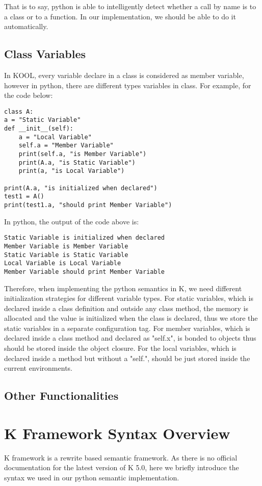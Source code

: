 \documentclass[a4paper]{article}
\begin{document}
That is to say, python is able to intelligently detect whether a call by name is to a class or to a function. In our implementation, we should be able to do it automatically.

\subsection{Class Variables}
In KOOL, every variable declare in a class is considered as member variable, however in python, there are different types variables in class. For example, for the code below:

\begin{lstlisting}
class A:
a = "Static Variable"
def __init__(self):
    a = "Local Variable"
    self.a = "Member Variable"
    print(self.a, "is Member Variable")
    print(A.a, "is Static Variable")
    print(a, "is Local Variable")

print(A.a, "is initialized when declared")
test1 = A()
print(test1.a, "should print Member Variable")
\end{lstlisting}

In python, the output of the code above is:

\begin{lstlisting}
Static Variable is initialized when declared
Member Variable is Member Variable
Static Variable is Static Variable
Local Variable is Local Variable
Member Variable should print Member Variable
\end{lstlisting}

Therefore, when implementing the python semantics in K, we need different initialization strategies for different variable types. For static variables, which is declared inside a class definition and outside any class method, the memory is allocated and the value is initialized when the class is declared, thus we store the static variables in a separate configuration tag. For member variables, which is declared inside a class method and declared as "self.x", is bonded to objects thus should be stored inside the object closure. For the local variables, which is declared inside a method but without a "self.", should be just stored inside the current environments.

\subsection{Other Functionalities}

\section{K Framework Syntax Overview}
K framework is a rewrite based semantic framework. As there is no official documentation for the latest version of K 5.0, here we briefly introduce the syntax we used in our python semantic implementation.
\end{document}
